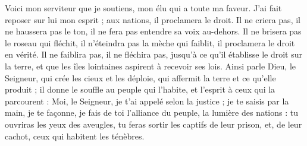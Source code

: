 Voici mon serviteur que je soutiens, mon élu qui a toute ma faveur. J’ai fait reposer sur lui mon esprit ; aux nations, il proclamera le droit.
Il ne criera pas, il ne haussera pas le ton, il ne fera pas entendre sa voix au-dehors.
Il ne brisera pas le roseau qui fléchit, il n’éteindra pas la mèche qui faiblit, il proclamera le droit en vérité.
Il ne faiblira pas, il ne fléchira pas, jusqu’à ce qu’il établisse le droit sur la terre, et que les îles lointaines aspirent à recevoir ses lois.
Ainsi parle Dieu, le Seigneur, qui crée les cieux et les déploie, qui affermit la terre et ce qu’elle produit ; il donne le souffle au peuple qui l’habite, et l’esprit à ceux qui la parcourent :
Moi, le Seigneur, je t’ai appelé selon la justice ; je te saisis par la main, je te façonne, je fais de toi l’alliance du peuple, la lumière des nations :
tu ouvriras les yeux des aveugles, tu feras sortir les captifs de leur prison, et, de leur cachot, ceux qui habitent les ténèbres.
